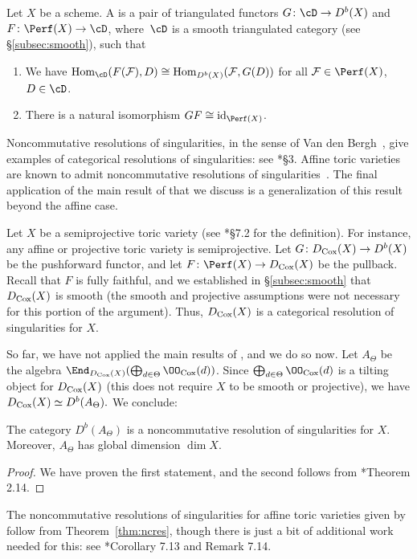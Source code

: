 \documentclass{amsart}
\begin{document}
\begin{defn}\cite{Kuznetsov08}
Let $X$ be a scheme. A  is a pair of triangulated functors $G \co \cD \to D^b(X)$ and $F \co \Perf(X) \to \cD$, where~$\cD$ is a smooth triangulated category (see \S \ref{subsec:smooth}), such that
\begin{enumerate}
\item We have $\Hom_{\cD}(F(\F), D) \cong \Hom_{D^b(X)}(\F, G(D))$ for all $\F \in \Perf(X)$, $D \in \cD$.
\item There is a natural isomorphism $G F \cong \id_{\Perf(X)}$.
\end{enumerate}
\end{defn}

Noncommutative resolutions of singularities, in the sense of Van den Bergh~\cite{VanDenBergh04}, give examples of categorical resolutions of singularities: see \cite{Kuznetsov08}*{\S 3}. Affine toric varieties are known to admit noncommutative resolutions of singularities~\cite{SV17, FMS19}. The final application of the main result of \cite{BBB+24} that we discuss is a generalization of this result beyond the affine case.

Let $X$ be a semiprojective toric variety (see \cite{CLS2011}*{\S 7.2} for the definition). For instance, any affine or projective toric variety is semiprojective.
Let $G \colon D_{\operatorname{Cox}}(X) \to D^b(X)$ be the pushforward functor, and let $F \co \Perf(X) \to D_{\Cox}(X)$ be the pullback. Recall that $F$ is fully faithful, and we established in \S \ref{subsec:smooth} that $D_{\operatorname{Cox}}(X)$ is smooth (the smooth and projective assumptions were not necessary for this portion of the argument). Thus, $D_{\operatorname{Cox}}(X)$ is a categorical resolution of singularities for $X$.

So far, we have not applied the main results of \cite{BBB+24}, and we do so now. Let $A_{\Theta}$ be the algebra $\End_{D_{\Cox}(X)}(\bigoplus_{d \in \Theta} \OO_{\Cox}(d))$. Since $\bigoplus_{d \in \Theta} \OO_{\Cox}(d)$ is a tilting object for $D_{\operatorname{Cox}}(X)$ (this does not require $X$ to be smooth or projective), we have
$
D_{\operatorname{Cox}}(X) \simeq D^b(A_\Theta).
$
We conclude:

\begin{thm}
\label{thm:ncres}
The category $D^b(A_\Theta)$ is a noncommutative resolution of singularities for $X$. Moreover, $A_\Theta$ has global dimension $\dim{X}$.
\end{thm}

\begin{proof}
We have  proven the first statement, and the second follows from \cite{FH23}*{Theorem 2.14}.
\end{proof}

The noncommutative resolutions of singularities for affine toric varieties given by~\cite{SV17, FMS19} follow from Theorem~\ref{thm:ncres}, though there is just a bit of additional work needed for this: see \cite{BBB+24}*{Corollary 7.13 and Remark 7.14}.

\ifdefined\whole
\else


\end{document}
